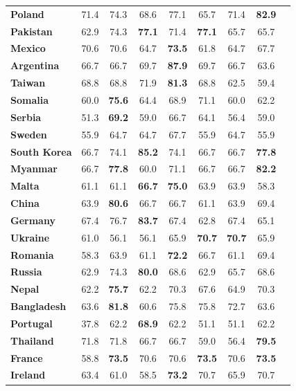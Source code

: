 \begin{table}
{\begin{tabular}{lcccccccc}
\textbf{Poland} & 71.4 & 74.3 & 68.6 & 77.1 & 65.7 & 71.4 & \textbf{82.9} \\
\textbf{Pakistan} & 62.9 & 74.3 & \textbf{77.1} & 71.4 & \textbf{77.1} & 65.7 & 65.7 \\
\textbf{Mexico} & 70.6 & 70.6 & 64.7 & \textbf{73.5} & 61.8 & 64.7 & 67.7 \\
\textbf{Argentina} & 66.7 & 66.7 & 69.7 & \textbf{87.9} & 69.7 & 66.7 & 63.6 \\
\textbf{Taiwan} & 68.8 & 68.8 & 71.9 & \textbf{81.3} & 68.8 & 62.5 & 59.4 \\
\textbf{Somalia} & 60.0 & \textbf{75.6} & 64.4 & 68.9 & 71.1 & 60.0 & 62.2 \\
\textbf{Serbia} & 51.3 & \textbf{69.2} & 59.0 & 66.7 & 64.1 & 56.4 & 59.0 \\
\textbf{Sweden} & 55.9 & 64.7 & 64.7 & 67.7 & 55.9 & 64.7 & 55.9 \\
\textbf{South Korea} & 66.7 & 74.1 & \textbf{85.2} & 74.1 & 66.7 & 66.7 & \textbf{77.8} \\
\textbf{Myanmar} & 66.7 & \textbf{77.8} & 60.0 & 71.1 & 66.7 & 66.7 & \textbf{82.2} \\
\textbf{Malta} & 61.1 & 61.1 & \textbf{66.7} & \textbf{75.0} & 63.9 & 63.9 & 58.3 \\
\textbf{China} & 63.9 & \textbf{80.6} & 66.7 & 66.7 & 61.1 & 63.9 & 69.4 \\
\textbf{Germany} & 67.4 & 76.7 & \textbf{83.7} & 67.4 & 62.8 & 67.4 & 65.1 \\
\textbf{Ukraine} & 61.0 & 56.1 & 56.1 & 65.9 & \textbf{70.7} & \textbf{70.7} & 65.9 \\
\textbf{Romania} & 58.3 & 63.9 & 61.1 & \textbf{72.2} & 66.7 & 61.1 & 69.4 \\
\textbf{Russia} & 62.9 & 74.3 & \textbf{80.0} & 68.6 & 62.9 & 65.7 & 68.6 \\
\textbf{Nepal} & 62.2 & \textbf{75.7} & 62.2 & 70.3 & 67.6 & 64.9 & 70.3 \\
\textbf{Bangladesh} & 63.6 & \textbf{81.8} & 60.6 & 75.8 & 75.8 & 72.7 & 63.6 \\
\textbf{Portugal} & 37.8 & 62.2 & \textbf{68.9} & 62.2 & 51.1 & 51.1 & 62.2 \\
\textbf{Thailand} & 71.8 & 71.8 & 66.7 & 66.7 & 59.0 & 56.4 & \textbf{79.5} \\
\textbf{France} & 58.8 & \textbf{73.5} & 70.6 & 70.6 & \textbf{73.5} & 70.6 & \textbf{73.5} \\
\textbf{Ireland} & 63.4 & 61.0 & 58.5 & \textbf{73.2} & 70.7 & 65.9 & 70.7 \\

\end{tabular}}
\end{table}
